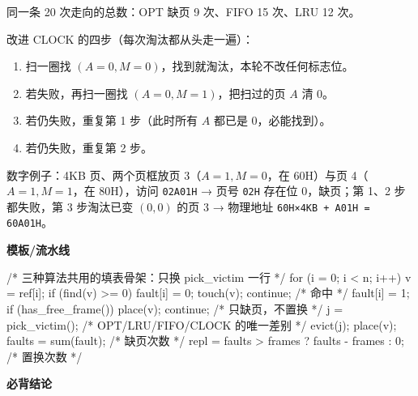 \documentclass[10pt,a4paper]{ctexart}
\begin{document}
同一条 20 次走向的总数：OPT 缺页 9 次、FIFO 15 次、LRU 12 次。


改进 CLOCK 的四步（每次淘汰都从头走一遍）：

\begin{enumerate}

\item 扫一圈找 $(A=0,M=0)$，找到就淘汰，本轮不改任何标志位。

\item 若失败，再扫一圈找 $(A=0,M=1)$，把扫过的页 $A$ 清 0。

\item 若仍失败，重复第 1 步（此时所有 $A$ 都已是 0，必能找到）。

\item 若仍失败，重复第 2 步。

\end{enumerate}

数字例子：4KB 页、两个页框放页 3（$A=1,M=0$，在 60H）与页 4（$A=1,M=1$，在 80H），访问 \texttt{02A01H} → 页号 \texttt{02H} 存在位 0，缺页；第 1、2 步都失败，第 3 步淘汰已变 $(0,0)$ 的页 3 → 物理地址 \texttt{60H×4KB + A01H = 60A01H}。

\textbf{模板/流水线}

\begin{codebox}
/* 三种算法共用的填表骨架：只换 pick_victim 一行 */
for (i = 0; i < n; i++) {
    v = ref[i];
    if (find(v) >= 0) { fault[i] = 0; touch(v); continue; }  /* 命中 */
    fault[i] = 1;
    if (has_free_frame()) { place(v); continue; }   /* 只缺页，不置换 */
    j = pick_victim();      /* OPT/LRU/FIFO/CLOCK 的唯一差别 */
    evict(j); place(v);
}
faults = sum(fault);                             /* 缺页次数 */
repl   = faults > frames ? faults - frames : 0;  /* 置换次数 */
\end{codebox}




\textbf{必背结论}
\end{document}
